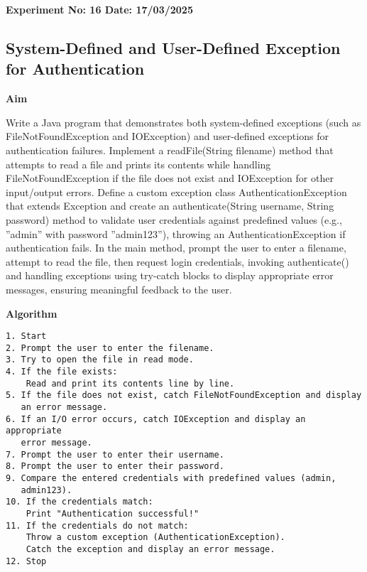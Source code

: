 \textbf{Experiment No: 16 \hfill Date: 17/03/2025}

\begin{center}
    \Large \subsection*{System-Defined and User-Defined Exception for Authentication}
\end{center}

\textbf{Aim}
\vspace{0.5cm}

Write a Java program that demonstrates both system-defined exceptions (such as FileNotFoundException and IOException) and user-defined exceptions for authentication failures. Implement a readFile(String filename) method that attempts to read a file and prints its contents while handling FileNotFoundException if the file does not exist and IOException for other input/output errors. Define a custom exception class AuthenticationException that extends Exception and create an authenticate(String username, String password) method to validate user credentials against predefined values (e.g., ”admin” with password ”admin123”), throwing an AuthenticationException if authentication fails. In the main method, prompt the user to enter a filename, attempt to read the file, then request login credentials, invoking authenticate() and handling exceptions using try-catch blocks to display appropriate error messages, ensuring meaningful feedback to the user.

\vspace{0.5cm}
\textbf{Algorithm}
\vspace{0.5cm}
\begin{verbatim}
1. Start
2. Prompt the user to enter the filename.
3. Try to open the file in read mode.
4. If the file exists:
    Read and print its contents line by line.
5. If the file does not exist, catch FileNotFoundException and display 
   an error message.
6. If an I/O error occurs, catch IOException and display an appropriate 
   error message.
7. Prompt the user to enter their username.
8. Prompt the user to enter their password.
9. Compare the entered credentials with predefined values (admin, 
   admin123).
10. If the credentials match:
    Print "Authentication successful!"
11. If the credentials do not match:
    Throw a custom exception (AuthenticationException).
    Catch the exception and display an error message.
12. Stop
\end{verbatim}

